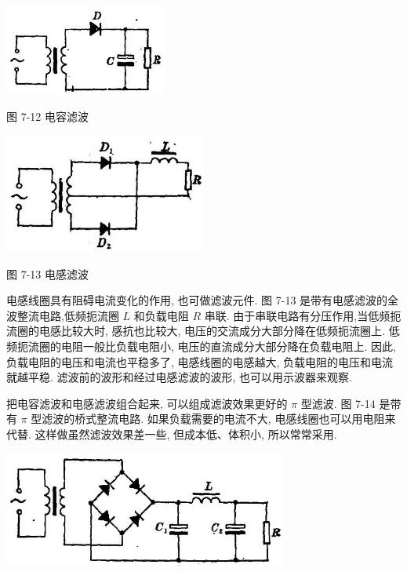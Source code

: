 \documentclass[10pt]{article}
\begin{document}
\begin{center}
\includegraphics[max width=0.4\textwidth]{images/01913056-1f15-74d8-9184-9aab52c9d66b_229_579842.jpg}
\end{center}

图 7-12 电容滤波

\begin{center}
\includegraphics[max width=0.5\textwidth]{images/01913056-1f15-74d8-9184-9aab52c9d66b_229_834126.jpg}
\end{center}

图 7-13 电感滤波

电感线圈具有阻碍电流变化的作用, 也可做滤波元件. 图 7-13 是带有电感滤波的全波整流电路,低频扼流圈 \(L\) 和负载电阻 \(R\) 串联. 由于串联电路有分压作用,当低频扼流圈的电感比较大时, 感抗也比较大, 电压的交流成分大部分降在低频扼流圈上. 低频扼流圈的电阻一般比负载电阻小, 电压的直流成分大部分降在负载电阻上. 因此, 负载电阻的电压和电流也平稳多了, 电感线圈的电感越大, 负载电阻的电压和电流就越平稳. 滤波前的波形和经过电感滤波的波形, 也可以用示波器来观察.

把电容滤波和电感滤波组合起来, 可以组成滤波效果更好的 \(\pi\) 型滤波. 图 7-14 是带有 \(\pi\) 型滤波的桥式整流电路. 如果负载需要的电流不大, 电感线圈也可以用电阻来代替. 这样做虽然滤波效果差一些, 但成本低、体积小, 所以常常采用.

\begin{center}
\includegraphics[max width=0.7\textwidth]{images/01913056-1f15-74d8-9184-9aab52c9d66b_229_355980.jpg}
\end{center}
\end{document}
